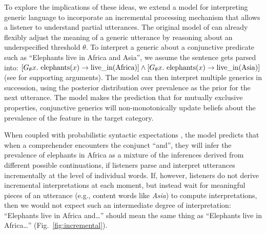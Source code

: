 \documentclass[letterpaper, 12pt]{article}
\begin{document}
To explore the implications of these ideas, we extend a model for interpreting generic language to incorporate an incremental processing mechanism that allows a listener to understand partial utterances.
The original model of  can already flexibly adjust the meaning of a generic utterance by reasoning about an underspecified threshold $\theta$.
To interpret a generic about a conjunctive predicate such as ``Elephants live in Africa and Asia'', we assume the sentence gets parsed into: $[G_\theta x. \textnormal{ elephants}(x) \to \textnormal{live\_in}(\textnormal{Africa})] \land [G_\theta x. \textnormal{ elephants}(x) \to \textnormal{live\_in}(\textnormal{Asia})]$ (see  for supporting arguments).
The model can then interpret multiple generics in succession, using the posterior distribution over prevalence as the prior for the next utterance. 
The model makes the prediction that for mutually exclusive properties, conjunctive generics will non-monotonically update beliefs about the prevalence of the feature in the target category. 

When coupled with probabilistic syntactic expectations \cite{Levy2008}, the model predicts that when a comprehender encounters the conjunct ``and'', they will infer the prevalence of elephants in Africa as a mixture of the inferences derived from different possible continuations, if listeners parse and interpret utterances incrementally at the level of individual words.
If, however, listeners do not derive incremental interpretations at each moment, but instead wait for meaningful pieces of an utterance (e.g., content words like \emph{Asia}) to compute interpretations, then we would not expect such an intermediate degree of interpretation: ``Elephants live in Africa and\ldots'' should mean the same thing as ``Elephants live in Africa\ldots'' (Fig.~\ref{fig:incremental}). 

\end{document}
